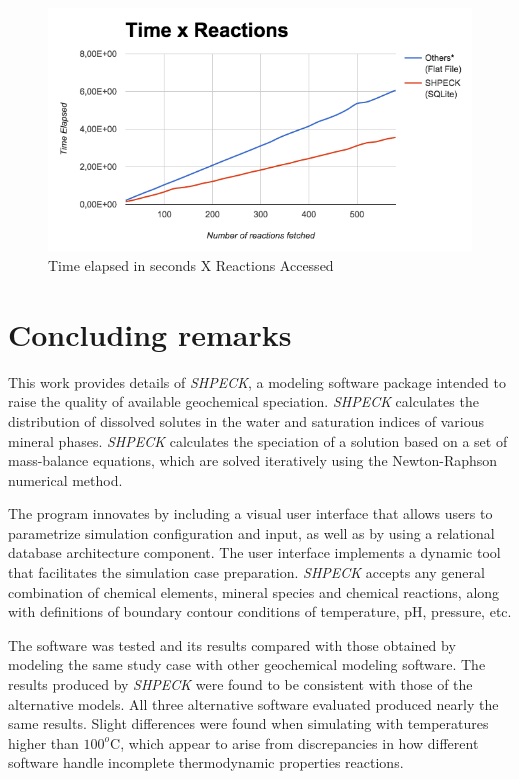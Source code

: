 \documentclass[preprint,12pt,3p]{elsarticle}
\begin{document}
\begin{figure}[ht!]
\centering
\includegraphics[width=140mm]{timeXreactionAccess.png}
\caption{Time elapsed in seconds X Reactions Accessed}
\label{fig:timeXaccess}
\end{figure}

\section{Concluding remarks}
This work provides details of \emph{SHPECK}, a modeling software package intended to raise the quality of available geochemical speciation. \emph{SHPECK} calculates the distribution of dissolved solutes in the water and saturation indices of various mineral phases. \emph{SHPECK} calculates the speciation of a solution based on a set of mass-balance equations, which are solved iteratively using the Newton-Raphson numerical method.

The program innovates by including a visual user interface that allows users to parametrize simulation configuration and input, as well as by using a relational database architecture component. The user interface implements a dynamic tool that facilitates the simulation case preparation. \emph{SHPECK} accepts any general combination of chemical elements, mineral species and chemical reactions, along with definitions of boundary contour conditions of temperature, pH, pressure, etc.

The software was tested and its results compared with those obtained by modeling the same study case with other geochemical modeling software. The results produced by \emph{SHPECK} were found to be consistent with those of the alternative models. All three alternative software evaluated produced nearly the same results. Slight differences were found when simulating with temperatures higher than $100^o$C, which appear to arise from discrepancies in how different software handle incomplete thermodynamic properties reactions.
\end{document}
